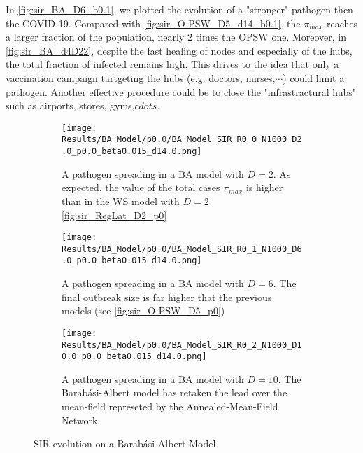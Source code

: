 \documentclass[a4paper,10pt,twoside]{book} %
\theoremstyle{definition}
\begin{document}
In \autoref{fig:sir_BA_D6_b0.1}, we plotted the evolution of a "stronger" pathogen then the COVID-19.
Compared with \autoref{fig:sir_O-PSW_D5_d14_b0.1}, the $ \pi_{max} $ reaches a larger fraction of the population, nearly $ 2$ times the OPSW one.
Moreover, in \autoref{fig:sir_BA_d4D22}, despite the fast healing of nodes and especially of the hubs, the total fraction of infected remains high. This drives to the idea that only a vaccination campaign tartgeting the hubs (e.g. doctors, nurses,$\cdots$) could limit a pathogen. Another effective procedure could be to close the "infrastractural hubs" such as airports, stores, gyms,$ cdots $.

\begin{figure}[p]
	\begin{subfigure}{.9\linewidth}
		\texttt{[image: Results/BA\_Model/p0.0/BA\_Model\_SIR\_R0\_0\_N1000\_D2.0\_p0.0\_beta0.015\_d14.0.png]}
		\caption{A pathogen spreading in a BA model with $D = 2$. As expected, the value of the total cases $ \pi_{max}$ is higher than in the WS model with $ D = 2$ \autoref{fig:sir_RegLat_D2_p0}}
		\label{fig:sir_BA_D2}
	\end{subfigure}
	\vspace{.5cm}
	\begin{subfigure}{.9\linewidth}
		\texttt{[image: Results/BA\_Model/p0.0/BA\_Model\_SIR\_R0\_1\_N1000\_D6.0\_p0.0\_beta0.015\_d14.0.png]}
		\caption{A pathogen spreading in a BA model with $D = 6$. The final outbreak size is far higher that the previous models (see \autoref{fig:sir_O-PSW_D5_p0})}
		\label{fig:sir_BA_D6}
	\end{subfigure}
	\vfill
	\begin{subfigure}{.9\linewidth}
		\texttt{[image: Results/BA\_Model/p0.0/BA\_Model\_SIR\_R0\_2\_N1000\_D10.0\_p0.0\_beta0.015\_d14.0.png]}
		\caption{A pathogen spreading in a BA model with $D = 10$. The Barabási-Albert model has retaken the lead over the mean-field represeted by the Annealed-Mean-Field Network.}
		\label{fig:sir_BA_D10}
	\end{subfigure}
	\caption{SIR evolution on a Barabási-Albert Model}
	\label{fig:sir_BA_COVID}
\end{figure}

\clearpage
\end{document}
